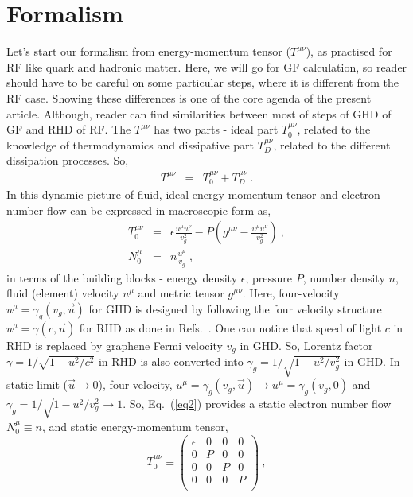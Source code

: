 \documentclass[amsmath,amssymb,aps,prb]{revtex4-2}
\newcommand{\bea}{\begin{eqnarray}}
\newcommand{\eea}{\end{eqnarray}}
\newcommand{\nn}{\nonumber}
\newcommand{\ep}{\epsilon}
\begin{document}
    \section{Formalism}
    \label{sec: Form}
    Let's start our formalism from energy-momentum tensor ($T^{\mu\nu}$), as practised for RF like quark and hadronic matter. Here, we will go for GF calculation, so reader should have to be careful on some particular steps, where it is different from the RF case. Showing these differences is one of the core agenda of the present article. Although, reader can find similarities between most of steps of GHD of GF and RHD of RF. The $T^{\mu\nu}$ has two parts - ideal part $T_0^{\mu\nu}$, related to the knowledge of thermodynamics and dissipative part $T_D^{\mu\nu}$, related to the different dissipation processes. So,
    \bea
    T^{\mu\nu} &=& T_0^{\mu\nu} + T_D^{\mu\nu}~. 
    \eea
    In this dynamic picture of fluid, ideal energy-momentum tensor and electron number flow can be expressed in macroscopic form as,
    \bea
    T_0^{\mu\nu} &=&  \ep \frac{u^\mu u^\nu}{v_g^2} - P\left(g^{\mu\nu} -\frac{u^\mu u^\nu}{v_g^2}\right)~,
    \nn\\
    N_0^\mu &=& n \frac{u^\mu}{v_g}~,
    \label{eq2}
    \eea
    in terms of the building blocks - energy density $\epsilon$, pressure $P$, number density $n$, fluid (element) velocity $u^\mu$ and metric tensor $g^{\mu \nu}$. Here, four-velocity $u^{\mu}=\gamma_g (v_g, \vec{u})$ for GHD is designed by following the four velocity structure $u^{\mu}=\gamma (c, \vec{u})$ for RHD as done in Refs.~\cite{eHD2}. One can notice that speed of light $c$ in RHD is replaced by graphene Fermi velocity $v_g$ in GHD. So, Lorentz factor $\gamma= 1/\sqrt{1-u^2/c^2}$ in RHD is also converted into $\gamma_g= 1/\sqrt{1-u^2/v_g^2}$ in GHD. In static limit (${\vec u}\rightarrow 0$), four velocity, $u^{\mu}=\gamma_g (v_g, \vec{u}) \rightarrow u^{\mu}=\gamma_g (v_g, 0)$ and $\gamma_g= 1/\sqrt{1-u^2/v_g^2} \rightarrow 1$. So, Eq.~(\ref{eq2}) provides a static electron number flow $N^\mu_0\equiv n$, and static energy-momentum tensor, 
    \begin{equation}
    T_0^{\mu\nu} \equiv  \begin{pmatrix}
    \epsilon &  0   &  0 & 0\\
     0  &   P &  0 & 0\\
     0  &  0  &  P &  0\\
     0  &  0  &  0 &  P\\
     \end{pmatrix}~,
%
    \end{equation}
\end{document}
